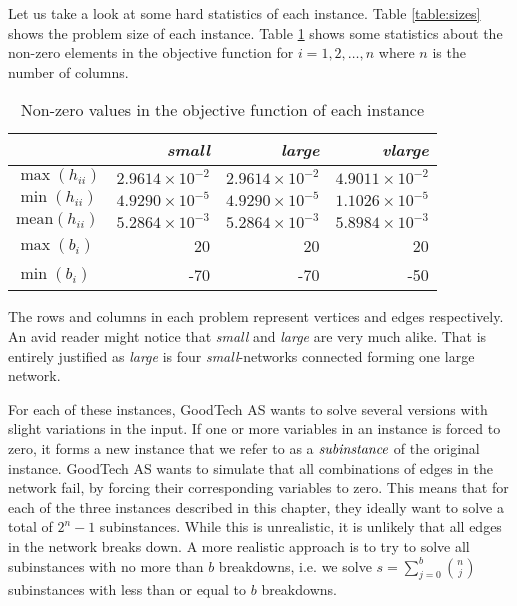 Let us take a look at some hard statistics of each instance.
Table \ref{table:sizes} shows the problem size of each instance.
Table \ref{table:maxmin} shows some statistics about the non-zero elements in
the objective function for $i = 1,2,\ldots,n$ where $n$ is the number of
columns.
\begin{table}
    \centering
    \caption{Non-zero values in the objective function of each instance}
    \begin{tabular}{lrrr}
                        & \textit{small}          & \textit{large}          & \textit{vlarge} \\\hline
    $\max(h_{ii})$      & $2.9614 \times 10^{-2}$ & $2.9614 \times 10^{-2}$ & $4.9011 \times 10^{-2}$ \\
    $\min(h_{ii})$      & $4.9290 \times 10^{-5}$ & $4.9290 \times 10^{-5}$ & $1.1026 \times 10^{-5}$ \\
$\textrm{mean}(h_{ii})$ & $5.2864 \times 10^{-3}$ & $5.2864 \times 10^{-3}$ & $5.8984 \times 10^{-3}$ \\
    $\max(b_{i})$       & 20                      & 20                      & 20 \\
    $\min(b_{i})$       & -70                     & -70                     & -50 \\
    \end{tabular}
    \label{table:maxmin}
\end{table}
The rows and columns in each problem represent vertices and edges respectively.
An avid reader might notice that \textit{small} and \textit{large} are very
much alike.
That is entirely justified as \textit{large} is four \textit{small}-networks
connected forming one large network.

For each of these instances, GoodTech AS wants to solve several versions
with slight variations in the input.
If one or more variables in an instance is forced to zero, it forms a new
instance that we refer to as a $\emph{subinstance}$ of the original instance.
GoodTech AS wants to simulate that all combinations of edges in the network
fail, by forcing their corresponding variables to zero.
This means that for each of the three instances described in this chapter,
they ideally want to solve a total of $2^n - 1$ subinstances. While this is
unrealistic, it is unlikely that all edges in the network breaks down.
A more realistic approach is to try to solve all subinstances with no more than
$b$ breakdowns, i.e. we solve $s = \sum_{j=0}^b {n \choose j}$ subinstances
with less than or equal to $b$ breakdowns.
